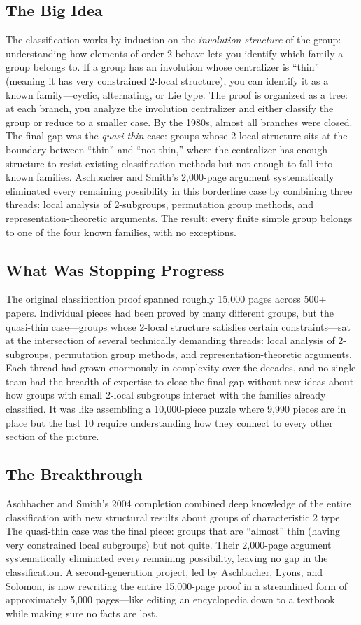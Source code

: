 \subsection{The Big Idea}
The classification works by induction on the \emph{involution structure} of the group: understanding how elements of order 2 behave lets you identify which family a group belongs to. If a group has an involution whose centralizer is ``thin'' (meaning it has very constrained 2-local structure), you can identify it as a known family---cyclic, alternating, or Lie type. The proof is organized as a tree: at each branch, you analyze the involution centralizer and either classify the group or reduce to a smaller case. By the 1980s, almost all branches were closed. The final gap was the \emph{quasi-thin} case: groups whose 2-local structure sits at the boundary between ``thin'' and ``not thin,'' where the centralizer has enough structure to resist existing classification methods but not enough to fall into known families. Aschbacher and Smith's 2,000-page argument systematically eliminated every remaining possibility in this borderline case by combining three threads: local analysis of 2-subgroups, permutation group methods, and representation-theoretic arguments. The result: every finite simple group belongs to one of the four known families, with no exceptions.

\subsection{What Was Stopping Progress}
The original classification proof spanned roughly 15,000 pages across 500+ papers. Individual pieces had been proved by many different groups, but the quasi-thin case---groups whose 2-local structure satisfies certain constraints---sat at the intersection of several technically demanding threads: local analysis of 2-subgroups, permutation group methods, and representation-theoretic arguments. Each thread had grown enormously in complexity over the decades, and no single team had the breadth of expertise to close the final gap without new ideas about how groups with small 2-local subgroups interact with the families already classified. It was like assembling a 10,000-piece puzzle where 9,990 pieces are in place but the last 10 require understanding how they connect to every other section of the picture.

\subsection{The Breakthrough}
Aschbacher and Smith's 2004 completion combined deep knowledge of the entire classification with new structural results about groups of characteristic 2 type. The quasi-thin case was the final piece: groups that are ``almost'' thin (having very constrained local subgroups) but not quite. Their 2,000-page argument systematically eliminated every remaining possibility, leaving no gap in the classification. A second-generation project, led by Aschbacher, Lyons, and Solomon, is now rewriting the entire 15,000-page proof in a streamlined form of approximately 5,000 pages---like editing an encyclopedia down to a textbook while making sure no facts are lost.

